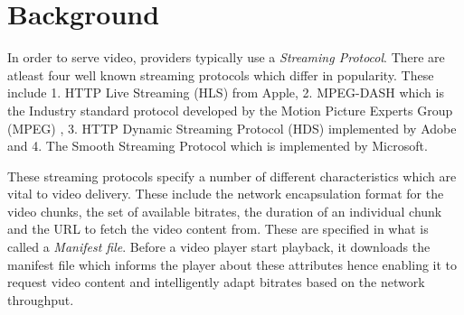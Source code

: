 \documentclass[]{sig-alternate-10pt}
\begin{document}

\hypertarget{background}{%
\section{Background}\label{background}}

In order to serve video, providers typically use a \emph{Streaming
Protocol}. There are atleast four well known streaming protocols which
differ in popularity. These include 1. HTTP Live Streaming (HLS)
\autocite{hls} from Apple, 2. MPEG-DASH which is the Industry standard
protocol developed by the Motion Picture Experts Group (MPEG)
\autocite{dash}, 3. HTTP Dynamic Streaming Protocol (HDS) \autocite{hds}
implemented by Adobe and 4. The Smooth Streaming Protocol \autocite{mss}
which is implemented by Microsoft.

These streaming protocols specify a number of different characteristics
which are vital to video delivery. These include the network
encapsulation format for the video chunks, the set of available
bitrates, the duration of an individual chunk and the URL to fetch the
video content from. These are specified in what is called a
\emph{Manifest file}. Before a video player start playback, it downloads
the manifest file which informs the player about these attributes hence
enabling it to request video content and intelligently adapt bitrates
based on the network throughput.
\end{document}
